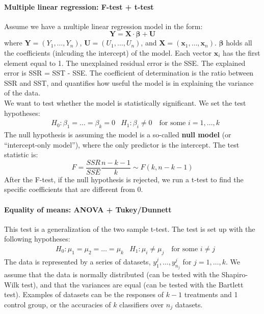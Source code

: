 \paragraph{Multiple linear regression: F-test + t-test}
Assume we have a multiple linear regression model in the form:
\begin{equation*}
    \mathbf{Y} = \mathbf{X} \cdot \boldsymbol{\beta} + \mathbf{U}
\end{equation*}
where $\mathbf{Y} = (Y_1, \ldots, Y_n)$, $\mathbf{U} = (U_1, \ldots, U_n)$, and $\mathbf{X} = (\mathbf{x}_1, \ldots, \mathbf{x}_n)$. $\boldsymbol{\beta}$ holds all the coefficients (inlcuding the intercept) of the model. Each vector $\mathbf{x}_i$ has the first element equal to 1. The unexplained residual error is the SSE. The explained error is SSR = SST - SSE. The coefficient of determination is the ratio between SSR and SST, and quantifies how useful the model is in explaining the variance of the data. \\
We want to test whether the model is statistically significant. We set the test hypotheses:
\begin{align*}
    &H_0 : \beta_1 = \ldots = \beta_k = 0 &H_1 : \beta_i \not = 0 \quad \text{for some } i = 1, \ldots, k
\end{align*}
The null hypothesis is assuming the model is a so-called \textbf{null model} (or ``intercept-only model''), where the only predictor is the intercept. The test statistic is:
\begin{equation*}
    F = \frac{SSR}{SSE} \frac{n - k -1}{k} \sim F(k, n-k-1)
\end{equation*}
After the F-test, if the null hypothesis is rejected, we run a t-test to find the specific coefficients that are different from 0.

\paragraph{Equality of means: ANOVA + Tukey/Dunnett}
This test is a generalization of the two sample t-test. The test is set up with the following hypotheses:
\begin{align*}
    &H_0 : \mu_1 = \mu_2 = \ldots = \mu_k &H_1 : \mu_i \not = \mu_j \quad \text{for some } i \not = j
\end{align*}
The data is represented by a series of datasets, $y_1^j, \ldots, y_{n_j}^j$ for $j = 1, \ldots, k$. We assume that the data is normally distributed (can be tested with the Shapiro-Wilk test), and that the variances are equal (can be tested with the Bartlett test). Examples of datasets can be the responses of $k-1$ treatments and 1 control group, or the accuracies of $k$ classifiers over $n_j$ datasets.

